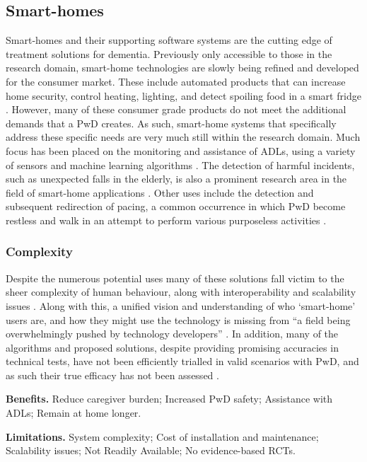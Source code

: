 \subsection{Smart-homes}
Smart-homes and their supporting software systems are the cutting edge of treatment solutions for dementia. Previously only accessible to those in the research domain, smart-home technologies are slowly being refined and developed for the consumer market. These include automated products that can increase home security, control heating, lighting, and detect spoiling food in a smart fridge \cite{Hoy2015, IControlStateofArt2015}. However, many of these consumer grade products do not meet the additional demands that a PwD creates. As such, smart-home systems that specifically address these specific needs are very much still within the research domain. Much focus has been placed on the monitoring and assistance of ADLs, using a variety of sensors and machine learning algorithms \cite{Cook2007, Cook2012, Hoey2007, Hoey2010, Chen2012}. The detection of harmful incidents, such as unexpected falls in the elderly, is also a prominent research area in the field of smart-home applications \cite{Chaquet2013,Yang2010}. Other uses include the detection and subsequent redirection of pacing, a common occurrence in which PwD become restless and walk in an attempt to perform various purposeless activities \cite{Nugent2011}.

\subsubsection{Complexity}
Despite the numerous potential uses many of these solutions fall victim to the sheer complexity of human behaviour, along with interoperability and scalability issues \cite{Cook2007, Tang2010, Lim2008}. Along with this, a unified vision and understanding of who `smart-home' users are, and how they might use the technology is missing from ``a field being overwhelmingly pushed by technology developers'' \cite{Wilson2015a}. In addition, many of the algorithms and proposed solutions, despite providing promising accuracies in technical tests, have not been efficiently trialled in valid scenarios with PwD, and as such their true efficacy has not been assessed \cite{Dawson2015, Lyons2015}.

\textbf{Benefits.}
Reduce caregiver burden; Increased PwD safety; Assistance with ADLs; Remain at home longer.

\textbf{Limitations.}
System complexity; Cost of installation and maintenance; Scalability issues; Not Readily Available; No evidence-based RCTs.

